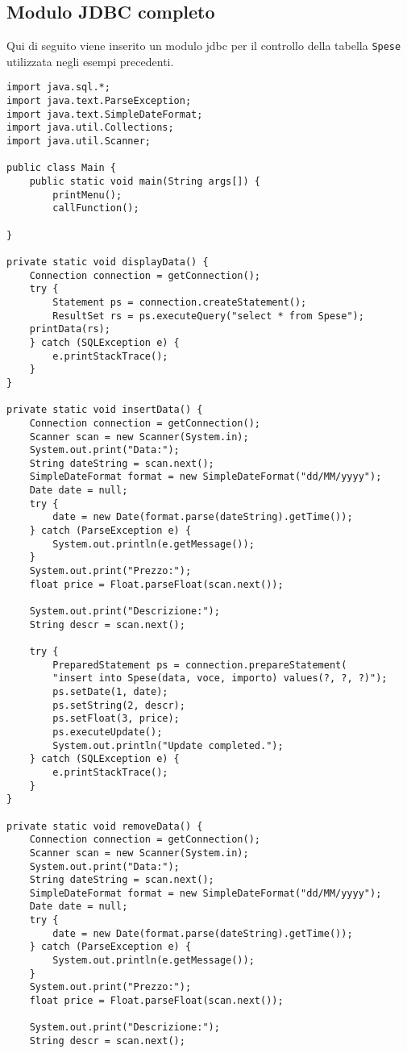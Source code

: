 \documentclass[a4paper, 10pt]{article}
\begin{document}
\subsection{Modulo JDBC completo}
Qui di seguito viene inserito un modulo jdbc per il controllo della tabella \lstinline|Spese| utilizzata negli esempi precedenti.

\begin{lstlisting}
import java.sql.*;
import java.text.ParseException;
import java.text.SimpleDateFormat;
import java.util.Collections;
import java.util.Scanner;

public class Main {
	public static void main(String args[]) {
		printMenu();
		callFunction();

}

private static void displayData() {
	Connection connection = getConnection();
	try {
		Statement ps = connection.createStatement();
		ResultSet rs = ps.executeQuery("select * from Spese");
	printData(rs);
	} catch (SQLException e) {
		e.printStackTrace();
	}
}

private static void insertData() {
	Connection connection = getConnection();
	Scanner scan = new Scanner(System.in);
	System.out.print("Data:");
	String dateString = scan.next();
	SimpleDateFormat format = new SimpleDateFormat("dd/MM/yyyy");
	Date date = null;
	try {
		date = new Date(format.parse(dateString).getTime());
	} catch (ParseException e) {
		System.out.println(e.getMessage());
	}
	System.out.print("Prezzo:");
	float price = Float.parseFloat(scan.next());
	
	System.out.print("Descrizione:");
	String descr = scan.next();
	
	try {
		PreparedStatement ps = connection.prepareStatement(
		"insert into Spese(data, voce, importo) values(?, ?, ?)");
		ps.setDate(1, date);
		ps.setString(2, descr);
		ps.setFloat(3, price);
		ps.executeUpdate();
		System.out.println("Update completed.");
	} catch (SQLException e) {
		e.printStackTrace();
	}	
}

private static void removeData() {
	Connection connection = getConnection();
	Scanner scan = new Scanner(System.in);
	System.out.print("Data:");
	String dateString = scan.next();
	SimpleDateFormat format = new SimpleDateFormat("dd/MM/yyyy");
	Date date = null;
	try {
		date = new Date(format.parse(dateString).getTime());
	} catch (ParseException e) {
		System.out.println(e.getMessage());
	}
	System.out.print("Prezzo:");
	float price = Float.parseFloat(scan.next());
	
	System.out.print("Descrizione:");
	String descr = scan.next();
	

\end{lstlisting}
\end{document}
